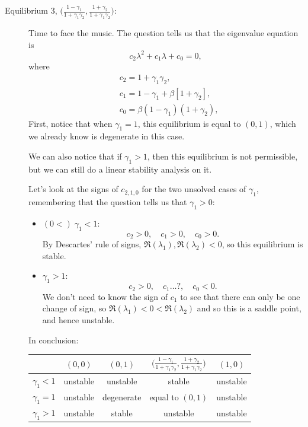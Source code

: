 \documentclass[a4paper,12pt]{article}
\begin{document}
\begin{enumerate}
{\begin{description}
		\item[Equilibrium 3, $\big(\frac{1-\gamma_1}{1+\gamma_1\gamma_2}, \frac{1+\gamma_2}{1+\gamma_1\gamma_2}\big)$:]
		Time to face the music. The question tells us that the eigenvalue equation is
	\begin{equation}
    c_2\lambda^2 + c_1\lambda + c_0 = 0,
    \end{equation}
    where 
    \begin{align}
    &c_2 = 1+\gamma_1\gamma_2,\\
    &c_1 = 1-\gamma_1+\beta[1+\gamma_2],\\
    &c_0 = \beta(1-\gamma_1)(1+\gamma_2),
    \end{align}
    First, notice that when $\gamma_1=1$, this equilibrium is equal to $(0,1)$, which we already know is degenerate in this case.
    
    We can also notice that if $\gamma_1>1$, then this equilibrium is not permissible, but we can still do a linear stability analysis on it.
    
	Let's look at the signs of $c_{2,1,0}$ for the two unsolved cases of $\gamma_1$, remembering that the question tells us that $\gamma_1>0$:
		\begin{itemize}
			\item $(0<)\;\gamma_1<1$:
			\[c_2>0, \quad c_1>0, \quad c_0>0.\]
			By Descartes' rule of signs, $\Re(\lambda_1),\Re(\lambda_2)<0$, so this equilibrium is stable.
			\item $\gamma_1>1$:
			\[c_2>0, \quad c_1 \dots ?, \quad c_0<0.\]
			We don't need to know the sign of $c_1$ to see that there can only be one change of sign, so $\Re(\lambda_1)<0<\Re(\lambda_2)$ and so this is a saddle point, and hence unstable.
		\end{itemize} 	
	In conclusion:
		
		\begin{center}
    	\begin{tabular}{ccccc}
		\toprule
		& $(0,0)$ & $(0,1)$ & $\big(\frac{1-\gamma_1}{1+\gamma_1\gamma_2}, \frac{1+\gamma_2}{1+\gamma_1\gamma_2}\big)$ & $(1,0)$ \\
		\midrule
		$\gamma_1<1$ & unstable & unstable & stable & unstable \\
		$\gamma_1=1$ & unstable & degenerate & equal to $(0,1)$ & unstable \\
		$\gamma_1>1$ & unstable & stable & unstable & unstable \\
		\bottomrule
		\end{tabular}
    	\end{center}	


\end{description}}
\end{enumerate}
\end{document}
